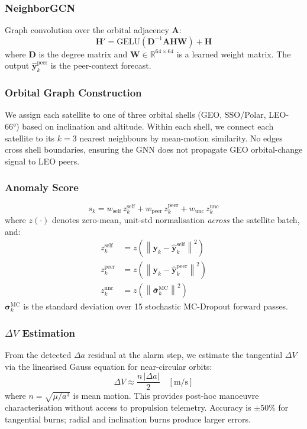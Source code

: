 \documentclass[conference]{IEEEtran}
\begin{document}
\subsubsection{NeighborGCN}
Graph convolution over the orbital adjacency $\mathbf{A}$:
\begin{equation}
  \mathbf{H}' = \text{GELU}(\mathbf{D}^{-1}\mathbf{A}\mathbf{H}\mathbf{W})
              + \mathbf{H}
\end{equation}
where $\mathbf{D}$ is the degree matrix and $\mathbf{W} \in
\mathbb{R}^{64 \times 64}$ is a learned weight matrix. The output
$\hat{\mathbf{y}}^{\text{peer}}_k$ is the peer-context forecast.

\subsubsection{Orbital Graph Construction}
We assign each satellite to one of three orbital shells (GEO, SSO/Polar,
LEO-66°) based on inclination and altitude. Within each shell, we
connect each satellite to its $k=3$ nearest neighbours by mean-motion
similarity. No edges cross shell boundaries, ensuring the GNN does
not propagate GEO orbital-change signal to LEO peers.

\subsubsection{Anomaly Score}
\begin{equation}
  s_k = w_\text{self}\,z_k^\text{self} +
        w_\text{peer}\,z_k^\text{peer} +
        w_\text{unc}\,z_k^\text{unc}
\end{equation}
where $z(\cdot)$ denotes zero-mean, unit-std normalisation
\emph{across} the satellite batch, and:
\begin{align}
  z_k^\text{self} &= z\!\left(\left\|\mathbf{y}_k - \hat{\mathbf{y}}_k^\text{self}\right\|^2\right) \\
  z_k^\text{peer} &= z\!\left(\left\|\mathbf{y}_k - \hat{\mathbf{y}}_k^\text{peer}\right\|^2\right) \\
  z_k^\text{unc}  &= z\!\left(\left\|\bar{\boldsymbol{\sigma}}_k^\text{MC}\right\|^2\right)
\end{align}
$\bar{\boldsymbol{\sigma}}_k^\text{MC}$ is the standard deviation over
15 stochastic MC-Dropout forward passes.

\subsubsection{$\Delta V$ Estimation}
From the detected $\Delta a$ residual at the alarm step, we estimate
the tangential $\Delta V$ via the linearised Gauss equation for
near-circular orbits:
\begin{equation}
  \Delta V \approx \frac{n\,|\Delta a|}{2}
  \quad [\text{m/s}]
\end{equation}
where $n = \sqrt{\mu/a^3}$ is mean motion. This provides post-hoc
manoeuvre characterisation without access to propulsion telemetry.
Accuracy is $\pm50\%$ for tangential burns; radial and inclination
burns produce larger errors.
\end{document}
